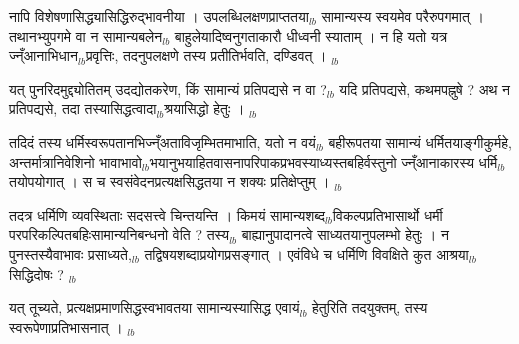 \documentclass[article,12pt,a4paper]{memoir}%
\newcounter{parCount}
\begin{document}
	  \pstart \leavevmode%
	नापि विशेषणासिद्ध्यासिद्धिरुद्भावनीया । उपलब्धिलक्षणप्राप्ततया{\tiny $_{lb}$} सामान्यस्य स्वयमेव परैरुपगमात् । तथानभ्युपगमे वा न सामान्यबलेन{\tiny $_{lb}$} बाहुलेयादिष्वनुगताकारौ धीध्वनी स्याताम् । न हि यतो यत्र ज्न्ँआनाभिधान{\tiny $_{lb}$}प्रवृत्तिः, तदनुपलक्षणे तस्य प्रतीतिर्भवति, दण्डिवत् ।
	{}
	\pend%
      {\tiny $_{lb}$}

	  \pstart \leavevmode%
	यत् पुनरिदमुद्द्योतितम् उदद्योतकरेण, किं सामान्यं प्रतिपद्यसे न वा ?{\tiny $_{lb}$} यदि प्रतिपद्यसे, कथमपह्नुषे ? अथ न प्रतिपद्यसे, तदा तस्यासिद्धत्वादा{\tiny $_{lb}$}श्रयासिद्धो हेतुः ।
	{}
	\pend%
      {\tiny $_{lb}$}

	  \pstart \leavevmode%
	तदिदं तस्य धर्मिस्वरूपतानभिज्न्ँअताविजृम्भितमाभाति, यतो न वयं{\tiny $_{lb}$} बहीरूपतया सामान्यं धर्मितयाङ्गीकुर्महे, अन्तर्मात्रानिवेशिनो भावाभावो{\tiny $_{lb}$}भयानुभयाहितवासनापरिपाकप्रभवस्याध्यस्तबहिर्वस्तुनो ज्न्ँआनाकारस्य धर्मि{\tiny $_{lb}$}तयोपयोगात् । स च स्वसंवेदनप्रत्यक्षसिद्धतया न शक्यः प्रतिक्षेप्तुम् ।
	{}
	\pend%
      {\tiny $_{lb}$}

	  \pstart \leavevmode%
	तदत्र धर्मिणि व्यवस्थिताः सदसत्त्वे चिन्तयन्ति । किमयं सामान्यशब्द{\tiny $_{lb}$}विकल्पप्रतिभासार्थो धर्मी परपरिकल्पितबहिःसामान्यनिबन्धनो वेति ? तस्य{\tiny $_{lb}$} बाह्यानुपादानत्वे साध्यतयानुपलम्भो हेतुः । न पुनस्तस्यैवाभावः प्रसाध्यते,{\tiny $_{lb}$} तद्विषयशब्दाप्रयोगप्रसङ्गात् । एवंविधे च धर्मिणि विवक्षिते कुत आश्रया{\tiny $_{lb}$}सिद्धिदोषः ?
	{}
	\pend%
      {\tiny $_{lb}$}

	  \pstart \leavevmode%
	यत् तूच्यते, प्रत्यक्षप्रमाणसिद्धस्वभावतया सामान्यस्यासिद्ध एवायं{\tiny $_{lb}$} हेतुरिति तदयुक्तम्, तस्य स्वरूपेणाप्रतिभासनात् ।
	{}
	\pend%
      {\tiny $_{lb}$}
\end{document}

